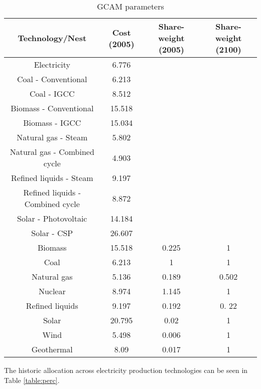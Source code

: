 \documentclass[10pt]{amsart}
\begin{document}
\begin{table}
\caption{GCAM parameters}
\centering
\begin{tabular}{c c c c}
\hline
\hline
Technology/Nest & Cost (2005) & Share-weight (2005) & Share-weight (2100) \\ [0.5ex]
\hline
Electricity & 6.776 & & \\
\hline
\hline
Coal - Conventional & 6.213 & & \\
Coal - IGCC & 8.512 & & \\
Biomass - Conventional & 15.518 & & \\
Biomass - IGCC & 15.034 & & \\
Natural gas - Steam & 5.802 & & \\
Natural gas - Combined cycle & 4.903  & & \\
Refined liquids - Steam & 9.197 & & \\
Refined liquids - Combined cycle & 8.872 & & \\
Solar - Photovoltaic & 14.184 & & \\
Solar - CSP & 26.607 & & \\
\hline 
\hline
Biomass & 15.518 & 0.225 & 1 \\
Coal & 6.213 & 1 & 1 \\
Natural gas & 5.136 & 0.189 & 0.502 \\
Nuclear & 8.974 & 1.145 & 1 \\
Refined liquids & 9.197 & 0.192 & 0. 22 \\
Solar & 20.795 & 0.02 & 1 \\
Wind & 5.498 & 0.006 & 1 \\
Geothermal & 8.09 & 0.017 & 1 \\ [1ex]
\hline
\end{tabular}
\label{table:nl.1}
\end{table}

The historic allocation across electricity production technologies can be seen in Table \ref{table:perc}.
\end{document}
